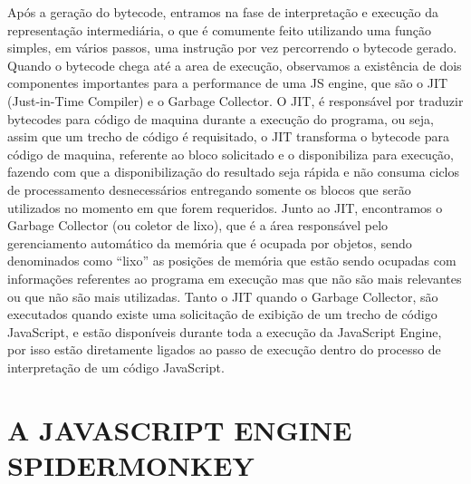 \documentclass{article}
\begin{document}
Após a geração do bytecode, entramos na fase de interpretação e execução da
representação intermediária, o que é comumente feito utilizando uma função simples, em
vários passos, uma instrução por vez percorrendo o bytecode gerado. Quando o bytecode
chega até a area de execução, observamos a existência de dois componentes importantes
para a performance de uma JS engine, que são o JIT (Just-in-Time Compiler) e o Garbage
Collector.
O JIT, é responsável por traduzir bytecodes para código de maquina durante a execução do
programa, ou seja, assim que um trecho de código é requisitado, o JIT transforma o
bytecode para código de maquina, referente ao bloco solicitado e o disponibiliza para
execução, fazendo com que a disponibilização do resultado seja rápida e não consuma
ciclos de processamento desnecessários entregando somente os blocos que serão
utilizados no momento em que forem requeridos.
Junto ao JIT, encontramos o Garbage Collector (ou coletor de lixo), que é a área
responsável pelo gerenciamento automático da memória que é ocupada por objetos, sendo
denominados como “lixo” as posições de memória que estão sendo ocupadas com
informações referentes ao programa em execução mas que não são mais relevantes ou que
não são mais utilizadas.
Tanto o JIT quando o Garbage Collector, são executados quando existe uma solicitação de
exibição de um trecho de código JavaScript, e estão disponíveis durante toda a execução da
JavaScript Engine, por isso estão diretamente ligados ao passo de execução dentro do
processo de interpretação de um código JavaScript.

\section{A JAVASCRIPT ENGINE SPIDERMONKEY}
\end{document}

